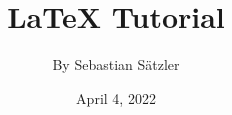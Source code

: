 \documentclass[a4paper,12pt]{book}
\begin{document}
\title{\Large{\textbf{LaTeX Tutorial}}}
\author{By Sebastian Sätzler}
\date{April 4, 2022}

\maketitle

\blindtext[5]
\end{document}
